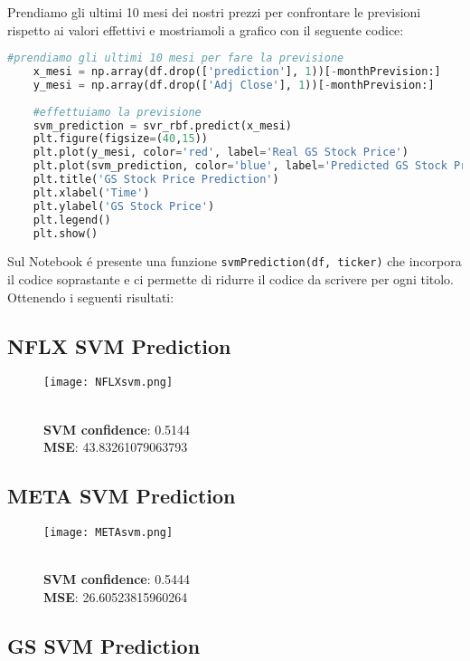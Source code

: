 \documentclass{report}
\begin{document}
Prendiamo gli ultimi 10 mesi dei nostri prezzi per confrontare le previsioni rispetto ai valori effettivi e mostriamoli a grafico con il seguente codice:

\begin{lstlisting}[language=python]
    #prendiamo gli ultimi 10 mesi per fare la previsione
    x_mesi = np.array(df.drop(['prediction'], 1))[-monthPrevision:]
    y_mesi = np.array(df.drop(['Adj Close'], 1))[-monthPrevision:]
    
    #effettuiamo la previsione
    svm_prediction = svr_rbf.predict(x_mesi)
    plt.figure(figsize=(40,15))
    plt.plot(y_mesi, color='red', label='Real GS Stock Price')
    plt.plot(svm_prediction, color='blue', label='Predicted GS Stock Price')
    plt.title('GS Stock Price Prediction')
    plt.xlabel('Time')
    plt.ylabel('GS Stock Price')
    plt.legend()
    plt.show()
\end{lstlisting}
Sul Notebook é presente una funzione \lstinline{svmPrediction(df, ticker)} che incorpora il codice soprastante e ci permette di ridurre il codice da scrivere per ogni titolo. Ottenendo i seguenti risultati:

\subsection{NFLX SVM Prediction}
\begin{figure}[h]
    \centering
    \texttt{[image: NFLXsvm.png]}
    \caption{\\ \textbf{SVM confidence}:  0.5144 \\ \textbf{MSE}:  43.83261079063793}
\end{figure}

\subsection{META SVM Prediction}

\begin{figure}[h]
    \centering
    \texttt{[image: METAsvm.png]}
    \caption{\\ \textbf{SVM confidence}:  0.5444 \\ \textbf{MSE}:  26.60523815960264}
\end{figure}

\subsection{GS SVM Prediction}
\end{document}
